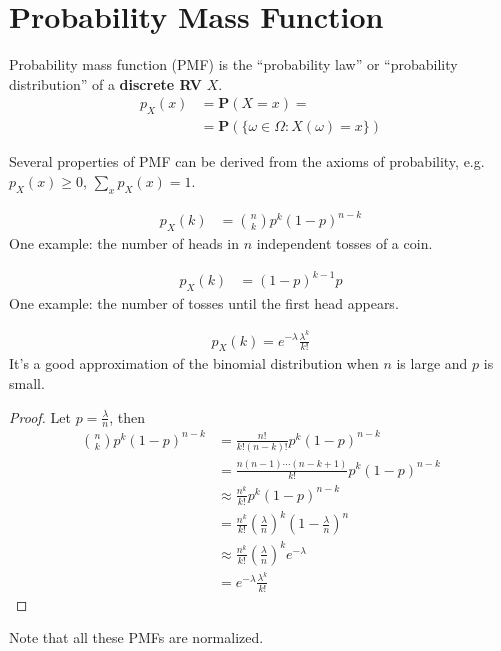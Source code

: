 \section{Probability Mass Function}
\begin{definition}
    Probability mass function (PMF) is the ``probability law'' or ``probability distribution'' of a \textbf{discrete RV} $X$.
    \begin{align}
        p_{X}(x) &= \mathbf{P}(X = x) = \\ 
                 &= \mathbf{P}(\{\omega \in \varOmega: X(\omega) = x\})
    \end{align}
\end{definition}
Several properties of PMF can be derived from the axioms of probability, e.g. $p_{X}(x) \geq 0$, $\sum_{x} p_{X}(x) = 1$.
\begin{example}
    \begin{align}
        p_{X}(k) &= \binom{n}{k} p^{k} (1-p)^{n-k}
    \end{align}
    One example: the number of heads in $n$ independent tosses of a coin.
\end{example}
\begin{example}
    \begin{align}
        p_{X}(k) &= (1-p)^{k-1} p
    \end{align}
    One example: the number of tosses until the first head appears.
\end{example}
\begin{example}
    \begin{align}
        p_{X}(k) = e^{-\lambda} \frac{\lambda^{k}}{k!}
    \end{align}
    It's a good approximation of the binomial distribution when $n$ is large and $p$ is small.
    \begin{proof}
        Let $p = \frac{\lambda}{n}$, then
        \begin{equation}
        \begin{aligned}
            \binom{n}{k} p^{k} (1-p)^{n-k} &= \frac{n!}{k!(n-k)!} p^{k} (1-p)^{n-k} \\
            &= \frac{n(n-1)\cdots(n-k+1)}{k!} p^{k} (1-p)^{n-k} \\
            &\approx \frac{n^{k}}{k!} p^{k} (1-p)^{n-k} \\
            &= \frac{n^{k}}{k!} \left(\frac{\lambda}{n}\right)^{k} \left(1-\frac{\lambda}{n}\right)^{n} \\
            &\approx \frac{n^{k}}{k!} \left(\frac{\lambda}{n}\right)^{k} e^{-\lambda} \\
            &= e^{-\lambda} \frac{\lambda^{k}}{k!}
        \end{aligned}
        \end{equation}
    \end{proof}
\end{example}
Note that all these PMFs are normalized.

